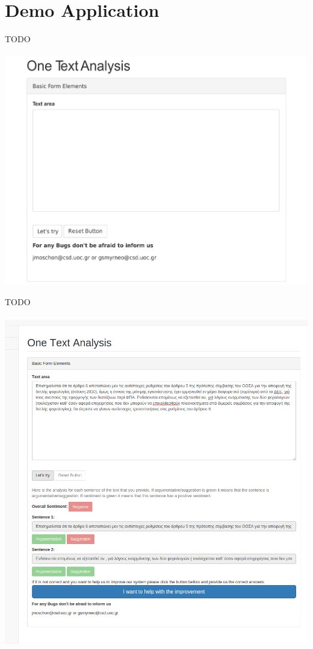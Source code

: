 
\chapter{Demo Application}
TODO\\
\\

\includegraphics[scale=0.28]{figure/screens/screen1_vector.pdf}

TODO\\
\\

\includegraphics[width=1\linewidth]{figure/screens/screen2.png}

